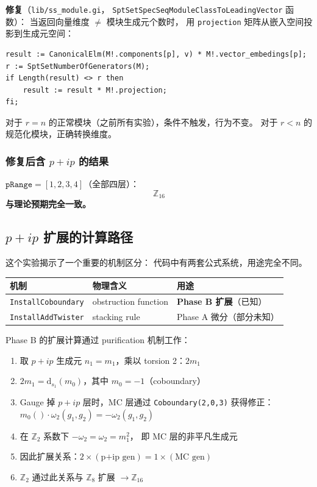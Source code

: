 \documentclass[a4paper,fontset=ubuntu,12pt]{ctexart}
\begin{document}
\textbf{修复}（\texttt{lib/ss\_module.gi}，
\texttt{SptSetSpecSeqModuleClassToLeadingVector} 函数）：
当返回向量维度 $\neq$ 模块生成元个数时，
用 \texttt{projection} 矩阵从嵌入空间投影到生成元空间：
\begin{verbatim}
result := CanonicalElm(M!.components[p], v) * M!.vector_embedings[p];
r := SptSetNumberOfGenerators(M);
if Length(result) <> r then
    result := result * M!.projection;
fi;
\end{verbatim}
对于 $r = n$ 的正常模块（之前所有实验），条件不触发，行为不变。
对于 $r < n$ 的规范化模块，正确转换维度。

\subsubsection{修复后含 $p{+}ip$ 的结果}

$\texttt{pRange} = [1,2,3,4]$（全部四层）：
\[
\boxed{\mathbb{Z}_{16}}
\]
\textbf{与理论预期完全一致。}

\subsection{$p{+}ip$ 扩展的计算路径}

这个实验揭示了一个重要的机制区分：
代码中有两套公式系统，用途完全不同。

\begin{center}
\begin{tabular}{l|l|l}
\hline
机制 & 物理含义 & 用途 \\
\hline
\texttt{InstallCoboundary} & obstruction function & \textbf{Phase B 扩展}（已知） \\
\texttt{InstallAddTwister} & stacking rule & Phase A 微分（部分未知） \\
\hline
\end{tabular}
\end{center}

Phase B 的扩展计算通过 purification 机制工作：
\begin{enumerate}
\item 取 $p{+}ip$ 生成元 $n_1 = m_1$，乘以 torsion 2：$2m_1$
\item $2m_1 = \mathrm{d}_{s_1}(m_0)$，其中 $m_0 = -1$（coboundary）
\item Gauge 掉 $p{+}ip$ 层时，MC 层通过 \texttt{Coboundary(2,0,3)} 获得修正：
      $m_0() \cdot \omega_2(g_1, g_2) = -\omega_2(g_1, g_2)$
\item 在 $\mathbb{Z}_2$ 系数下 $-\omega_2 = \omega_2 = m_1^2$，
      即 MC 层的非平凡生成元
\item 因此扩展关系：$2 \times (\text{p+ip gen}) = 1 \times (\text{MC gen})$
\item $\mathbb{Z}_2$ 通过此关系与 $\mathbb{Z}_8$ 扩展 $\to \mathbb{Z}_{16}$
\end{enumerate}
\end{document}
